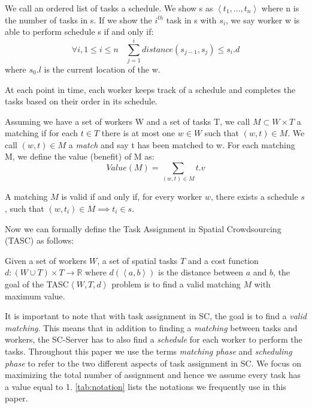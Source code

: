 \begin{definition} [Schedule]
We call an ordered list of tasks a schedule. We show s as $\left\langle t_1, ..., t_n \right\rangle$ where n is the number of tasks in s. If we show the $i^{th}$ task in s with $s_i$, we say worker w is able to perform schedule s if and only if:
\begin{equation*}
\forall i, 1\leq i \leq n \ \ \ \ \sum_{j=1}^i distance(s_{j-1}, s_j) \leq s_i.d
\end{equation*}
where $s_0.l$ is the current location of the w.
\end{definition}

At each point in time, each worker keeps track of a schedule and completes the tasks based on their order in its schedule.

\begin{definition} [Matching]
Assuming we have a set of workers W and a set of tasks T, we call $M \subset W \times T$ a matching if for each $t \in T$ there is at most one $w \in W$ such that $\left( w, t \right) \in M$. We call $\left( w, t \right) \in M$ a \emph{match} and say t has been matched to w. For each matching M, we define the value (benefit) of M as:
\begin{equation*}
Value(M) = \sum_{\left( w, t \right) \in M} t.v
\end{equation*}
\end{definition}

\noindent A matching $M$ is valid if and only if, for every worker $w$, there exists a schedule $s$, such that $(w, t_i) \in M \implies t_i \in s$. 

Now we can formally define the Task Assignment in Spatial Crowdsourcing (TASC) as follows:

\begin{definition}
Given a set of workers $W$, a set of spatial tasks $T$ and a cost function $d: \left( W \cup T \right) \times T \rightarrow \mathbb{R}$ where $d \left( \left\langle a,b \right\rangle \right)$ is the distance between $a$ and $b$, the goal of the TASC$\left\langle W, T, d \right\rangle$ problem is to find a valid matching $M$ with maximum value.
\end{definition}

It is important to note that with task assignment in SC, the goal is to find a \textit{valid matching}. This means that in addition to finding a \textit{matching} between tasks and workers, the SC-Server has to also find a \textit{schedule} for each worker to perform the tasks. Throughout this paper we use the terms \textit{matching phase} and \textit{scheduling phase} to refer to the two different aspects of task assignment in SC. We focus on maximizing the total number of assignment and hence we assume every task has a value equal to 1. \cref{tab:notation} lists the notations we frequently use in this paper.\\

